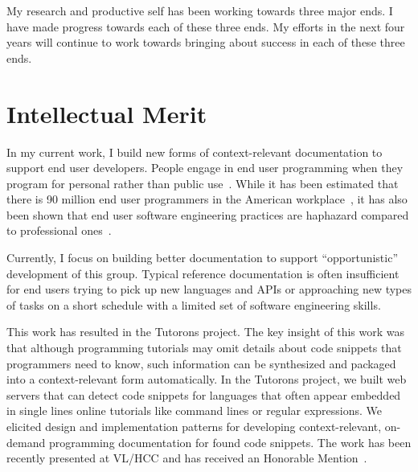 \documentclass[12pt]{memoir}
\begin{document}
My research and productive self has been working towards three major ends.
I have made progress towards each of these three ends.
My efforts in the next four years will continue to work towards bringing about success in each of these three ends.
\fi

\section{Intellectual Merit}

In my current work, I build new forms of context-relevant documentation to support end user developers.
People engage in end user programming when they program for personal rather than public use~\cite{ko_state_2011}.
While it has been estimated that there is 90 million end user programmers in the American workplace~\cite{scaffidi_estimating_2005}, it has also been shown that end user software engineering practices are haphazard compared to professional ones~\cite{ko_state_2011}.

Currently, I focus on building better documentation to support ``opportunistic''~\cite{clarke_what_2007} development of this group.
Typical reference documentation is often insufficient for end users trying to pick up new languages and APIs or approaching new types of tasks on a short schedule with a limited set of software engineering skills.

This work has resulted in the Tutorons project.
The key insight of this work was that although programming tutorials may omit details about code snippets that programmers need to know, such information can be synthesized and packaged into a context-relevant form automatically.
In the Tutorons project, we built web servers that can detect code snippets for languages that often appear embedded in single lines online tutorials like command lines or regular expressions.
We elicited design and implementation patterns for developing context-relevant, on-demand programming documentation for found code snippets.
The work has been recently presented at VL/HCC and has received an Honorable Mention~\cite{head_tutorons_2015}.
\end{document}
